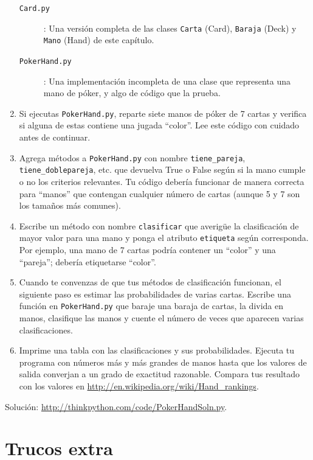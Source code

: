 \documentclass[10pt]{book}
\begin{document}
\begin{exercise}
\begin{enumerate}
\begin{description}
\item[{\tt Card.py}]: Una versión completa de las clases {\tt Carta} (Card),
{\tt Baraja} (Deck) y {\tt Mano} (Hand) de este capítulo.

\item[{\tt PokerHand.py}]: Una implementación incompleta de una clase
que representa una mano de póker, y algo de código que la prueba.

\end{description}
%
\item Si ejecutas {\tt PokerHand.py}, reparte siete manos de póker de 7 cartas
y verifica si alguna de estas contiene una jugada ``color''.  Lee este
código con cuidado antes de continuar.

\item Agrega métodos a {\tt PokerHand.py} con nombre \verb"tiene_pareja",
\verb"tiene_doblepareja", etc. que devuelva True o False según si
la mano cumple o no los criterios relevantes.  Tu código debería
funcionar de manera correcta para ``manos'' que contengan cualquier número de cartas
(aunque 5 y 7 son los tamaños más comunes).

\item Escribe un método con nombre {\tt clasificar} que averigüe
la clasificación de mayor valor para una mano y ponga el atributo
{\tt etiqueta} según corresponda.  Por ejemplo, una mano de 7 cartas
podría contener un ``color'' y una ``pareja''; debería etiquetarse ``color''.

\item Cuando te convenzas de que tus métodos de clasificación
funcionan, el siguiente paso es estimar las probabilidades de varias
cartas.  Escribe una función en {\tt PokerHand.py} que baraje una baraja de
cartas, la divida en manos, clasifique las manos y cuente el
número de veces que aparecen varias clasificaciones.

\item Imprime una tabla con las clasificaciones y sus probabilidades.
Ejecuta tu programa con números más y más grandes de manos hasta que los
valores de salida converjan a un grado de exactitud razonable.  Compara
tus resultado con los valores en \url{http://en.wikipedia.org/wiki/Hand_rankings}.

\end{enumerate}

Solución: \url{http://thinkpython.com/code/PokerHandSoln.py}.
\end{exercise}


\chapter{Trucos extra}
\end{document}
